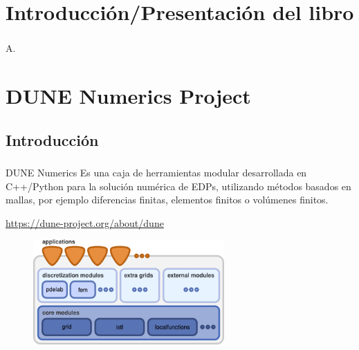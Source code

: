 
\section{Introducción/Presentación del libro}

\begin{frame}
	\frametitle{\secname}
	A.
\end{frame}

\section{DUNE Numerics Project}
\subsection{Introducción}

\begin{frame}
	\frametitle{\secname}
	\framesubtitle{\subsecname}

	\begin{alertblock}{DUNE Numerics}
	Es una caja de herramientas modular desarrollada en C++/Python para la solución numérica de EDPs, utilizando
	métodos basados en mallas, por ejemplo diferencias finitas, elementos finitos o volúmenes finitos.

	\url{https://dune-project.org/about/dune}
	\end{alertblock}

	\begin{figure}[ht!]
		\centering
		\includegraphics[height=4cm]{dunedesign}
	\end{figure}

\end{frame}

